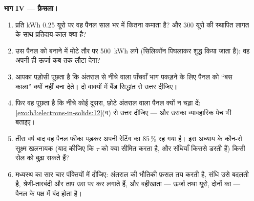 \begin{problem}
\medskip\noindent\textbf{भाग IV --- फ़ैसला।}

\begin{enumerate}[resume]
  \item प्रति \unit{kWh} 0.25 यूरो पर वह पैनल साल भर में कितना
        कमाता है? और 300 यूरो की स्थापित लागत के साथ
        प्रतिदाय-काल क्या है?
  \item उस पैनल को बनाने में मोटे तौर पर \qty{500}{kWh} लगे
        (सिलिकॉन पिघलाकर शुद्ध किया जाता है): वह अपनी ही ऊर्जा
        कब तक लौटा देगा?
  \item आपका पड़ोसी पूछता है कि अंतराल से नीचे वाला पाँचवाँ भाग
        पकड़ने के लिए पैनल को ``बस काला'' क्यों नहीं बना देते।
        दो वाक्यों में बैंड सिद्धांत से उत्तर दीजिए।
  \item फिर वह पूछता है कि नीचे कोई दूसरा, छोटे अंतराल वाला पैनल
        क्यों न चढ़ा दें: \cref{exo:b3:electrons-in-solids:12}(ग)
        से उत्तर दीजिए --- और उसका व्यावहारिक
        पेच भी बताइए।
  \item तीस वर्ष बाद वह पैनल फीका पड़कर अपनी रेटिंग का 85\,\% रह
        गया है। इस अध्याय के कौन-से सूक्ष्म खलनायक
        (याद कीजिए कि $\tau$ को क्या सीमित करता है, और संधियाँ किससे
        डरती हैं) किसी सेल को बुढ़ा सकते हैं?
  \item मध्यस्थ का सार चार पंक्तियों में दीजिए: अंतराल की भौतिकी
        फ़सल तय करती है, संधि उसे बदलती है, श्रेणी-तारबंदी और ताप
        उस पर कर लगाते हैं, और बहीखाता --- ऊर्जा तथा यूरो, दोनों का
        --- पैनल के पक्ष में बंद होता है।
\end{enumerate}
\end{problem}
